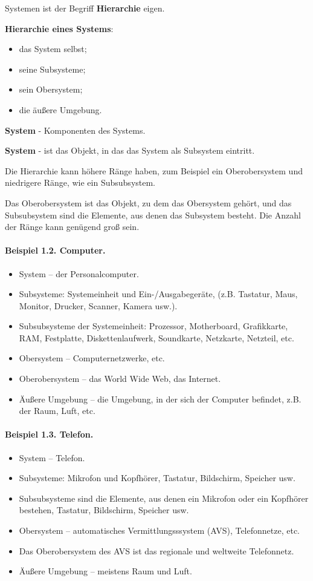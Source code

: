 \documentclass[11pt,a4paper]{article}
\begin{document}
Systemen ist der Begriff \textbf{Hierarchie} eigen. 

\textbf{Hierarchie eines Systems}:
\begin{itemize}[noitemsep]
\item das System selbst;
\item seine Subsysteme;
\item sein Obersystem;
\item die äußere Umgebung.
\end{itemize}
\textbf{System} - Komponenten des Systems.

\textbf{System} - ist das Objekt, in das das System als Subsystem eintritt.

Die Hierarchie kann höhere Ränge haben, zum Beispiel ein Oberobersystem und
niedrigere Ränge, wie ein Subsubsystem.

Das Oberobersystem ist das Objekt, zu dem das Obersystem gehört, und das
Subsubsystem sind die Elemente, aus denen das Subsystem besteht. Die Anzahl
der Ränge kann genügend groß sein.

\paragraph{Beispiel 1.2. Computer.}
\begin{itemize}[noitemsep]
\item System -- der Personalcomputer.
\item Subsysteme: Systemeinheit und Ein-/Ausgabegeräte, (z.B.
  Tastatur, Maus, Monitor, Drucker, Scanner, Kamera usw.).
\item Subsubsysteme der Systemeinheit: Prozessor, Motherboard, Grafikkarte,
  RAM, Festplatte, Diskettenlaufwerk, Soundkarte, Netzkarte, Netzteil, etc.
\item Obersystem -- Computernetzwerke, etc.
\item Oberobersystem -- das World Wide Web, das Internet.
\item Äußere Umgebung -- die Umgebung, in der sich der Computer befindet,
  z.B. der Raum, Luft, etc. 
\end{itemize}

\paragraph{Beispiel 1.3. Telefon.}
\begin{itemize}[noitemsep]
\item System -- Telefon.
\item Subsysteme: Mikrofon und Kopfhörer, Tastatur, Bildschirm, Speicher usw.
\item Subsubsysteme sind die Elemente, aus denen ein Mikrofon oder ein
  Kopfhörer bestehen, Tastatur, Bildschirm, Speicher usw.  
\item Obersystem -- automatisches Vermittlungsssystem (AVS), Telefonnetze,
  etc.
\item Das Oberobersystem des AVS ist das regionale und weltweite Telefonnetz.
\item Äußere Umgebung -- meistens Raum und Luft.
\end{itemize}
\end{document}
